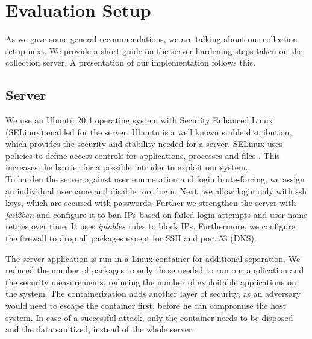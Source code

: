 \section{Evaluation Setup}
\label{sec:measurement:eval_setup}
%
    As we gave some general recommendations, we are talking about our collection setup next.
    We provide a short guide on the server hardening steps taken on the collection server. A presentation of our implementation follows this.
    
    \subsection{Server}
        \label{subsec:measure:server}
        We use an Ubuntu 20.4 operating system with Security Enhanced Linux (SELinux) \cite{noauthor_what_nodate-1} enabled for the server.
        Ubuntu is a well known stable distribution, which provides the security and stability needed for a server. SELinux uses policies to define access controls for applications, processes and files \cite{noauthor_what_nodate-1}. This increases the barrier for a possible intruder to exploit our system.\\
        
        To harden the server against user enumeration and login brute-forcing, we assign an individual username and disable root login. Next, we allow login only with ssh keys, which are secured with passwords.
        Further we strengthen the server with \textit{fail2ban} and configure it to ban IPs based on failed login attempts and user name retries over time. It uses \textit{iptables} rules to block IPs. Furthermore, we configure the firewall to drop all packages except for SSH and port 53 (DNS).\\
        
\newpage        
    
        The server application is run in a Linux container for additional separation. We reduced the number of packages to only those needed to run our application and the security measurements, reducing the number of exploitable applications on the system. The containerization adds another layer of security, as an adversary would need to escape the container first, before he can compromise the host system. In case of a successful attack, only the container needs to be disposed and the data sanitized, instead of the whole server.
        
